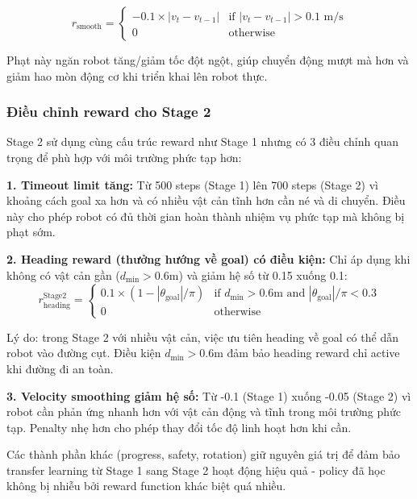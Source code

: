 \begin{equation}
r_{\text{smooth}} = \begin{cases}
-0.1 \times |v_t - v_{t-1}| & \text{if } |v_t - v_{t-1}| > 0.1 \text{ m/s}\\
0 & \text{otherwise}
\end{cases}
\end{equation}

Phạt này ngăn robot tăng/giảm tốc đột ngột, giúp chuyển động mượt mà hơn và giảm hao mòn động cơ khi triển khai lên robot thực.

\subsubsection{Điều chỉnh reward cho Stage 2}

Stage 2 sử dụng cùng cấu trúc reward như Stage 1 nhưng có 3 điều chỉnh quan trọng để phù hợp với môi trường phức tạp hơn:

\textbf{1. Timeout limit tăng:} Từ 500 steps (Stage 1) lên 700 steps (Stage 2) vì khoảng cách goal xa hơn và có nhiều vật cản tĩnh hơn cần né và di chuyển. Điều này cho phép robot có đủ thời gian hoàn thành nhiệm vụ phức tạp mà không bị phạt sớm.

\textbf{2. Heading reward (thưởng hướng về goal) có điều kiện:} Chỉ áp dụng khi không có vật cản gần ($d_{\min} > 0.6$m) và giảm hệ số từ 0.15 xuống 0.1:
\begin{equation}
r_{\text{heading}}^{\text{Stage2}} = \begin{cases}
0.1 \times (1 - |\theta_{\text{goal}}|/\pi) & \text{if } d_{\min} > 0.6\text{m and } |\theta_{\text{goal}}|/\pi < 0.3\\
0 & \text{otherwise}
\end{cases}
\end{equation}

Lý do: trong Stage 2 với nhiều vật cản, việc ưu tiên heading về goal có thể dẫn robot vào đường cụt. Điều kiện $d_{\min} > 0.6$m đảm bảo heading reward chỉ active khi đường đi an toàn.

\textbf{3. Velocity smoothing giảm hệ số:} Từ -0.1 (Stage 1) xuống -0.05 (Stage 2) vì robot cần phản ứng nhanh hơn với vật cản động và tĩnh trong môi trường phức tạp. Penalty nhẹ hơn cho phép thay đổi tốc độ linh hoạt hơn khi cần.

Các thành phần khác (progress, safety, rotation) giữ nguyên giá trị để đảm bảo transfer learning từ Stage 1 sang Stage 2 hoạt động hiệu quả - policy đã học không bị nhiễu bởi reward function khác biệt quá nhiều.

